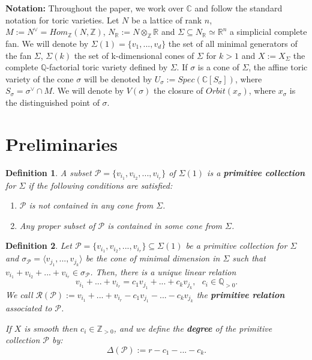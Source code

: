 \documentclass[10pt]{article}
\newtheorem{de}{Definition}[section]
\begin{document}
 
\textbf{Notation:}	Throughout  the paper, we work over $\mathbb{C}$ and follow the standard notation for toric varieties.
Let $N$ be a lattice of rank $n$, $M:=N^{\vee}=Hom_\mathbb{Z}(N,\mathbb{Z})$, $N_\mathbb{R}:=N\otimes_\mathbb{Z}\mathbb{R}$ and $\Sigma\subseteq N_\mathbb{R}\simeq\mathbb{R}^n$ a simplicial complete fan. We will denote by $\Sigma(1)=\{v_1,...,v_d\}$ the set of all minimal generators of the fan $\Sigma$, $\Sigma(k)$ the set of k-dimensional cones of $\Sigma$ for $k>1$ and $X:=X_{\Sigma}$ the complete $\mathbb{Q}$-factorial toric variety defined by $\Sigma$. If $\sigma$ is a cone of $\Sigma$, the affine toric variety of the cone $\sigma$ will be denoted by $U_{\sigma}:=Spec(\mathbb{C}[S_{\sigma}])$, where $S_{\sigma}=\sigma^\vee \cap M$. We will denote by $V(\sigma)$ the closure of $Orbit(x_\sigma)$, where $x_\sigma$ is the distinguished point of $\sigma$. 

\section{Preliminaries}
\begin{de} A subset $\mathcal{P}=\{v_{i_1},v_{i_2},...,v_{i_r}\}$ of $\Sigma(1)$ is a \textbf{primitive collection} for $\Sigma$ if the following conditions are satisfied:\\
\begin{enumerate}
 \item 
$\mathcal{P}$ is not contained in any cone from $\Sigma$.
\item Any proper subset of $\mathcal{P}$ is contained in some cone from $\Sigma$.
 \end{enumerate}
 
\end{de}

\begin{de}  Let $\mathcal{P}=\{v_{i_1},v_{i_2},...,v_{i_r}\}\subseteq\Sigma(1)$ be a primitive collection for $\Sigma$ and $\sigma_{\mathcal{P}}=\langle{v_{j_1},...,v_{j_k}}\rangle$ be the cone of minimal dimension in $\Sigma$ such that $v_{i_1}+v_{i_2}+...+v_{i_r}\in\sigma_{\mathcal{P}}$. Then, there is a unique linear relation $$v_{i_1}+...+v_{i_r}=c_1v_{j_1}+...+c_kv_{j_k}, \ \ \ c_i\in\mathbb{Q}_{>0}.$$
We call  $\mathcal{R(P)}:=v_{i_1}+...+v_{i_r}-c_1v_{j_1}-...-c_kv_{j_k}$ the \textbf{primitive relation} associated to $\mathcal{P}$.

If $X$ is smooth then $c_i\in\mathbb{Z}_{>0}$, and we define the \textbf{degree} of the primitive collection $\mathcal{P}$ by:
$$\Delta(\mathcal{P}):=r-c_1-...-c_k.$$
\end{de}
\end{document}
